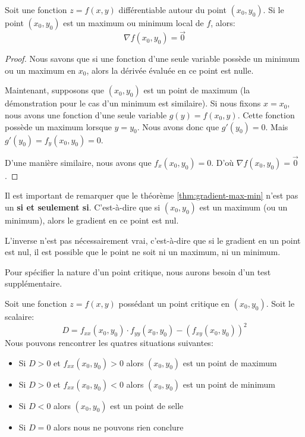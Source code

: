 \documentclass[]{book}
\providecommand{\tightlist}{%
  \setlength{\itemsep}{0pt}\setlength{\parskip}{0pt}}
\theoremstyle{definition}
\theoremstyle{definition}
\theoremstyle{definition}
\theoremstyle{remark}
\let\BeginKnitrBlock\begin \let\EndKnitrBlock\end
\begin{document}
\BeginKnitrBlock{theorem}
\protect\hypertarget{thm:gradient-max-min}{}{\label{thm:gradient-max-min}
}Soit une fonction \(z=f(x,y)\) différentiable autour du point
\((x_0,y_0)\). Si le point \((x_0,y_0)\) est un maximum ou minimum local
de \(f\), alors: \[ \nabla f(x_0,y_0)=\overrightarrow{0} \]
\EndKnitrBlock{theorem}

\BeginKnitrBlock{proof}
{}Nous savons que si une fonction d'une seule
variable possède un minimum ou un maximum en \(x_0\), alors la dérivée
évaluée en ce point est nulle.

Maintenant, supposons que \((x_0,y_0)\) est un point de maximum (la
démonstration pour le cas d'un minimum est similaire). Si nous fixons
\(x=x_0\), nous avons une fonction d'une seule variable
\(g(y)=f(x_0,y)\). Cette fonction possède un maximum lorsque \(y=y_0\).
Nous avons donc que \(g'(y_0)=0\). Mais \(g'(y_0)=f_y(x_0,y_0)=0\).

D'une manière similaire, nous avons que \(f_x(x_0,y_0)=0\). D'où
\(\nabla f(x_0,y_0)=\overrightarrow{0}\).
\EndKnitrBlock{proof}

\BeginKnitrBlock{remark}
{}Il est important de remarquer que le
théorème \ref{thm:gradient-max-min} n'est pas un \textbf{si et seulement
si}. C'est-à-dire que si \((x_0,y_0)\) est un maximum (ou un minimum),
alors le gradient en ce point est nul.

L'inverse n'est pas nécessairement vrai, c'est-à-dire que si le gradient
en un point est nul, il est possible que le point ne soit ni un maximum,
ni un minimum.
\EndKnitrBlock{remark}

Pour spécifier la nature d'un point critique, nous aurons besoin d'un
test supplémentaire.

\BeginKnitrBlock{theorem}
\protect\hypertarget{thm:test-derivee-seconde}{}{\label{thm:test-derivee-seconde}
}Soit une fonction \(z=f(x,y)\) possédant un point critique en
\((x_0,y_0)\). Soit le scalaire:
\[ D=f_{xx}(x_0,y_0)\cdot f_{yy}(x_0,y_0)-\left(f_{xy}(x_0,y_0) \right)^2 \]
Nous pouvons rencontrer les quatres situations suivantes:

\begin{itemize}
\tightlist
\item
  Si \(D>0\) et \(f_{xx}(x_0,y_0)>0\) alors \((x_0,y_0)\) est un point
  de maximum
\item
  Si \(D>0\) et \(f_{xx}(x_0,y_0)<0\) alors \((x_0,y_0)\) est un point
  de minimum
\item
  Si \(D<0\) alors \((x_0,y_0)\) est un point de selle
\item
  Si \(D=0\) alors nous ne pouvons rien conclure
\end{itemize}
\EndKnitrBlock{theorem}
\end{document}
